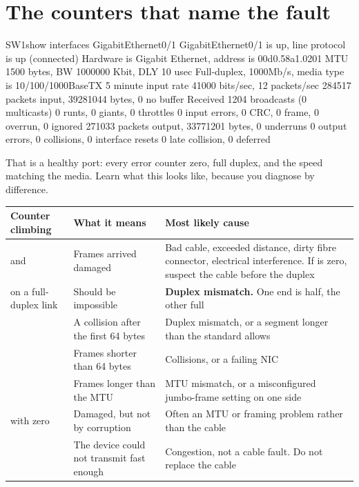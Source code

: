 \section{The counters that name the fault}

\begin{verify}{SW1}{show interfaces GigabitEthernet0/1}
GigabitEthernet0/1 is up, line protocol is up (connected)
  Hardware is Gigabit Ethernet, address is 00d0.58a1.0201
  MTU 1500 bytes, BW 1000000 Kbit, DLY 10 usec
  Full-duplex, 1000Mb/s, media type is 10/100/1000BaseTX
  5 minute input rate 41000 bits/sec, 12 packets/sec
     284517 packets input, 39281044 bytes, 0 no buffer
     Received 1204 broadcasts (0 multicasts)
     0 runts, 0 giants, 0 throttles
     0 input errors, 0 CRC, 0 frame, 0 overrun, 0 ignored
     271033 packets output, 33771201 bytes, 0 underruns
     0 output errors, 0 collisions, 0 interface resets
     0 late collision, 0 deferred
\end{verify}

That is a healthy port: every error counter zero, full duplex, and the speed
matching the media. Learn what this looks like, because you diagnose by
difference.

\begin{longtable}{@{}L{3.4cm}L{5.4cm}L{6.1cm}@{}}
\toprule
{}
\textbf{Counter climbing} & \textbf{What it means} & \textbf{Most likely cause} \\
\midrule
\endhead
{} and  & Frames arrived damaged & Bad cable, exceeded
distance, dirty fibre connector, electrical interference. If  is
zero, suspect the cable before the duplex \\
 on a full-duplex link & Should be impossible & \textbf{Duplex
mismatch.} One end is half, the other full \\
 & A collision after the first 64 bytes & Duplex mismatch, or
a segment longer than the standard allows \\
 & Frames shorter than 64 bytes & Collisions, or a failing NIC \\
 & Frames longer than the MTU & MTU mismatch, or a misconfigured
jumbo-frame setting on one side \\
 with  zero & Damaged, but not by corruption & Often
an MTU or framing problem rather than the cable \\
 & The device could not transmit fast enough & Congestion, not
a cable fault. Do not replace the cable \\
\bottomrule
\end{longtable}

